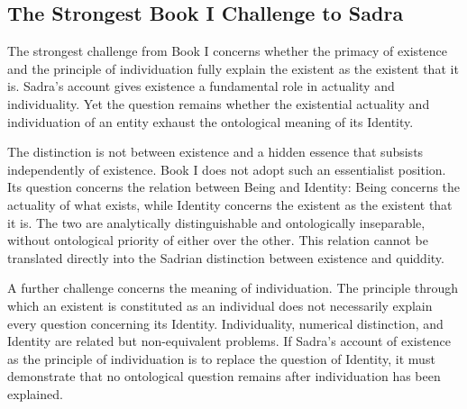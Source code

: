 


\subsection{The Strongest Book I Challenge to Sadra}
\label{subsec:ch08_s17_ss16}

\label{para:VS.B01.P01.C08.S17.SS16.P001}

The strongest challenge from
Book I concerns whether
the primacy of existence
and the principle of
individuation fully explain
the existent as the
existent that it is.
Sadra's account gives
existence a fundamental
role in actuality and
individuality. Yet the
question remains whether
the existential actuality
and individuation of
an entity exhaust the
ontological meaning
of its Identity.

\label{para:VS.B01.P01.C08.S17.SS16.P002}

The distinction is not
between existence and
a hidden essence that
subsists independently
of existence. Book I
does not adopt such
an essentialist position.
Its question concerns
the relation between
Being and Identity:
Being concerns the
actuality of what exists,
while Identity concerns
the existent as the
existent that it is.
The two are analytically
distinguishable and
ontologically inseparable,
without ontological
priority of either over
the other. This relation
cannot be translated
directly into the
Sadrian distinction
between existence and
quiddity.

\label{para:VS.B01.P01.C08.S17.SS16.P003}

A further challenge concerns
the meaning of individuation.
The principle through
which an existent is
constituted as an
individual does not
necessarily explain
every question concerning
its Identity. Individuality,
numerical distinction,
and Identity are related
but non-equivalent
problems. If Sadra's
account of existence
as the principle of
individuation is to
replace the question
of Identity, it must
demonstrate that no
ontological question
remains after individuation
has been explained.

